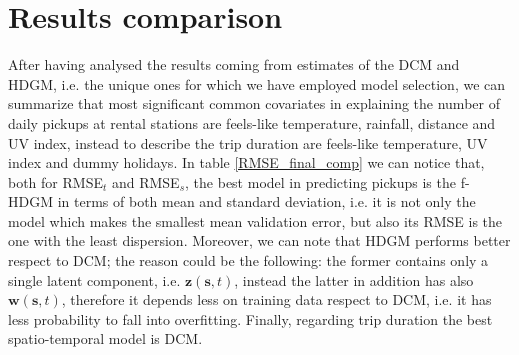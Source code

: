 \section{Results comparison}

After having analysed the results coming from estimates of the DCM and HDGM, i.e. the unique ones for which we have employed model selection, we can summarize that most significant common covariates in explaining the number of daily pickups at rental stations are feels-like temperature, rainfall, distance and UV index, instead to describe the trip duration are feels-like temperature, UV index and dummy holidays. In table \ref{RMSE_final_comp} we can notice that, both for RMSE$_t$ and RMSE$_s$, the best model in predicting pickups is the f-HDGM in terms of both mean and standard deviation, i.e. it is not only the model which makes the smallest mean validation error, but also its RMSE is the one with the least dispersion. Moreover, we can note that HDGM performs better respect to DCM; the reason could be the following: the former contains only a single latent component, i.e. $\boldsymbol{z}(\boldsymbol{s}, t)$, instead the latter in addition has also $\boldsymbol{w}(\boldsymbol{s}, t)$, therefore it depends less on training data respect to DCM, i.e. it has less probability to fall into overfitting. Finally, regarding trip duration the best spatio-temporal model is DCM.

